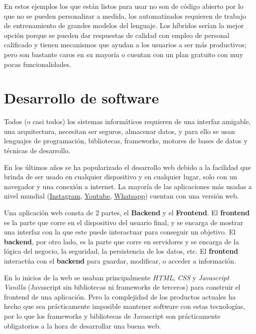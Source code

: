 En estos ejemplos los que están listos para usar no son de código abierto por lo que no se pueden personalizar a medida, los automatizados requieren de trabajo de entrenamiento de grandes modelos del lenguaje. Los híbridos serían la mejor opción porque se pueden dar respuestas de calidad con empleo de personal calificado y tienen mecanismos que ayudan a los usuarios a ser más productivos; pero son bastante caros en su mayoría o cuentan con un plan gratuito con muy pocas funcionalidades.

\section{Desarrollo de software}

Todos (o casi todos) los sistemas informáticos requieren de una interfaz amigable, una arquitectura, necesitan ser seguros, almacenar datos, y para ello se usan lenguajes de programación, bibliotecas, frameworks, motores de bases de datos y técnicas de desarrollo.
\newline

En los últimos años se ha popularizado el desarrollo web debido a la facilidad que brinda de ser usado en cualquier dispositivo y en cualquier lugar, solo con un navegador y una conexión a internet. La mayoría de las aplicaciones más usadas a nivel mundial (\href{instagram.com}{Instagram}, \href{youtube.com}{Youtube}, \href{https://web.whatsapp.com/}{Whatsapp}) cuentan con una versión web.
\newline

Una aplicación web consta de 2 partes, el \textbf{Backend} y el \textbf{Frontend}. El \textbf{frontend} es la parte que corre en el dispositivo del usuario final, y se encarga de mostrar una interfaz con la que este puede interactuar para conseguir un objetivo. El \textbf{backend}, por otro lado, es la parte que corre en servidores y se encarga de la lógica del negocio, la seguridad, la persistencia de los datos, etc. El \textbf{frontend} interactúa con el \textbf{backend} para guardar, modificar, o acceder a información.
\newline

En lo inicios de la web se usaban principalmente \textit{HTML}, \textit{CSS} y \textit{Javascript Vanilla} (Javascript sin bibliotecas ni frameworks de terceros) para construir el frontend de una aplicación. Pero la complejidad de los productos actuales ha hecho que sea prácticamente imposible mantener software con estas tecnologías, por lo que los frameworks y bibliotecas de Javascript son prácticamente obligatorios a la hora de desarrollar una buena web.
\newline

